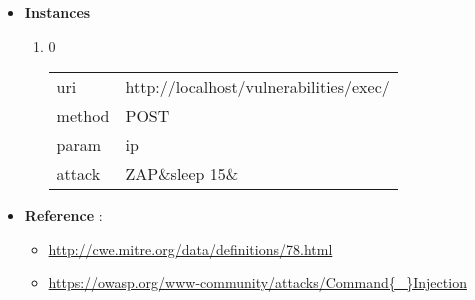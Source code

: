 \documentclass[10pt]{article}
\begin{document}
\begin{itemize}
\item[] \textbf{Instances}
\begin{enumerate}
\item[] 0
\begin{tabular}{| l | p{14cm}}
uri & http://localhost/vulnerabilities/exec/ \\
method & POST \\
param & ip \\
attack & ZAP\&sleep 15\& \\
\end{tabular}
\end{enumerate}
\item[] \textbf{Reference} : 
\begin{itemize}
\item \url{http://cwe.mitre.org/data/definitions/78.html}
\item \url{https://owasp.org/www-community/attacks/Command{\_}Injection}
\end{itemize}
\end{itemize}
\end{document}

